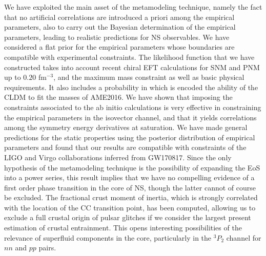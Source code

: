 We have exploited the main asset of the metamodeling technique, namely the 
fact that no artificial correlations are introduced a priori among the 
empirical parameters, also to carry out the Bayesian determination of the 
empirical parameters, leading to realistic predictions for NS observables. We 
have considered a flat prior for the empirical parameters whose boundaries are
compatible with experimental constraints. 
The likelihood function that we have constructed takes into account recent 
chiral EFT calculations for SNM and PNM up to $0.20$ fm$^{-3}$, and 
the maximum mass constraint as well as basic physical requirements. 
It also includes a probability in which is encoded the ability of the CLDM to 
fit the masses of AME2016. We have shown that imposing the constraints
associated to the ab initio calculations is very effective in constraining the 
empirical parameters in the isovector channel, and that it yields 
correlations among the symmetry energy derivatives at saturation.
We have made general predictions for the static properties using the posterior 
distribution of empirical parameters and found that our results are compatible 
with constraints of the LIGO and Virgo collaborations inferred from GW170817.
%
{Since the only hypothesis of the metamodeling technique is the 
  possibility of expanding the EoS into a power series, this result implies 
  that we have no compelling evidence of a first order phase transition in the 
  core of NS, though the latter cannot of course be excluded.}
%
The fractional crust moment of inertia, which is strongly correlated with the 
location of the CC transition point, has been computed, allowing us to exclude 
a full crustal origin of pulsar glitches if we consider the largest present 
estimation of crustal entrainment. This opens interesting possibilities of the
relevance of superfluid components in the core, particularly in the $^3P_2$
channel for $nn$ and $pp$ pairs.

